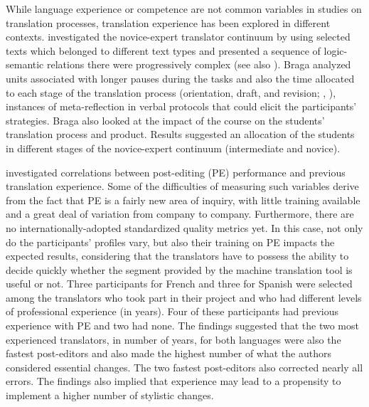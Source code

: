 \documentclass[output=paper]{langscibook}
\begin{document}
While language experience or competence are not common variables in studies on translation processes, translation experience has been explored in different contexts. \citet{de2007indagando} investigated the novice-expert translator continuum by using selected texts which belonged to different text types and presented a sequence of logic-semantic relations there were progressively complex (see also \citealt{halliday2014introduction}). Braga analyzed units associated with longer pauses during the tasks and also the time allocated to each stage of the translation process (orientation, draft, and revision; \citealt{lykke2002translation}, \citeyear{jakobsen2003effects}), instances of meta-reflection in verbal protocols that could elicit the participants’ strategies. Braga also looked at the impact of the course on the students’ translation process and product. Results suggested an allocation of the students in different stages of the novice-expert continuum (intermediate and novice).

\citet{de2010analysing} investigated correlations between post-editing (PE) performance and previous translation experience. Some of the difficulties of measuring such variables derive from the fact that PE is a fairly new area of inquiry, with little training available and a great deal of variation from company to company. Furthermore, there are no internationally-adopted standardized quality metrics yet. In this case, not only do the participants’ profiles vary, but also their training on PE impacts the expected results, considering that the translators have to possess the ability to decide quickly whether the segment provided by the machine translation tool is useful or not. Three participants for French and three for Spanish were selected among the translators who took part in their project and who had different levels of professional experience (in years). Four of these participants had previous experience with PE and two had none. The findings suggested that the two most experienced translators, in number of years, for both languages were also the fastest post-editors and also made the highest number of what the authors considered essential changes. The two fastest post-editors also corrected nearly all errors. The findings also implied that experience may lead to a propensity to implement a higher number of stylistic changes. 
\end{document}
